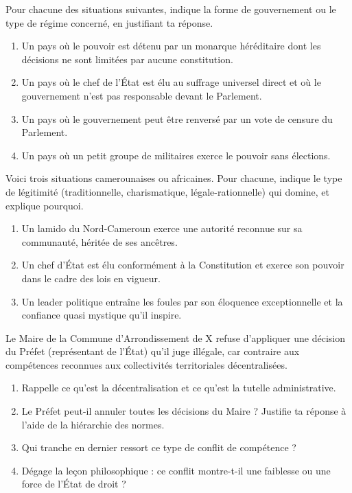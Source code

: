\documentclass[11pt]{article}
\begin{document}
\begin{exercice}
Pour chacune des situations suivantes, indique la forme de gouvernement ou le type de régime concerné, en justifiant ta réponse.
\begin{enumerate}
\item Un pays où le pouvoir est détenu par un monarque héréditaire dont les décisions ne sont limitées par aucune constitution.
\item Un pays où le chef de l'État est élu au suffrage universel direct et où le gouvernement n'est pas responsable devant le Parlement.
\item Un pays où le gouvernement peut être renversé par un vote de censure du Parlement.
\item Un pays où un petit groupe de militaires exerce le pouvoir sans élections.
\end{enumerate}
\end{exercice}

\begin{exercice}
Voici trois situations camerounaises ou africaines. Pour chacune, indique le type de légitimité (traditionnelle, charismatique, légale-rationnelle) qui domine, et explique pourquoi.
\begin{enumerate}
\item Un lamido du Nord-Cameroun exerce une autorité reconnue sur sa communauté, héritée de ses ancêtres.
\item Un chef d'État est élu conformément à la Constitution et exerce son pouvoir dans le cadre des lois en vigueur.
\item Un leader politique entraîne les foules par son éloquence exceptionnelle et la confiance quasi mystique qu'il inspire.
\end{enumerate}
\end{exercice}

\begin{exercice}
Le Maire de la Commune d'Arrondissement de X refuse d'appliquer une décision du Préfet (représentant de l'État) qu'il juge illégale, car contraire aux compétences reconnues aux collectivités territoriales décentralisées.
\begin{enumerate}
\item Rappelle ce qu'est la décentralisation et ce qu'est la tutelle administrative.
\item Le Préfet peut-il annuler toutes les décisions du Maire ? Justifie ta réponse à l'aide de la hiérarchie des normes.
\item Qui tranche en dernier ressort ce type de conflit de compétence ?
\item Dégage la leçon philosophique : ce conflit montre-t-il une faiblesse ou une force de l'État de droit ?
\end{enumerate}
\end{exercice}
\end{document}
